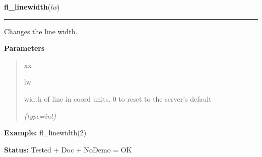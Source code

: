     \label{xformslib:flxbasic:fl_linewidth}

    \vspace{0.5ex}

\hspace{.8\funcindent}\begin{boxedminipage}{\funcwidth}

    \raggedright \textbf{fl\_linewidth}(\textit{lw})

    \vspace{-1.5ex}

    \rule{\textwidth}{0.5\fboxrule}
\setlength{\parskip}{2ex}
    Changes the line width.

\setlength{\parskip}{1ex}
      \textbf{Parameters}
      \vspace{-1ex}

      \begin{quote}
        \begin{Ventry}{xx}

          \item[lw]

          width of line in coord units. 0 to reset to the server's default

            {\it (type=int)}

        \end{Ventry}

      \end{quote}

\textbf{Example:} fl\_linewidth(2)



\textbf{Status:} Tested + Doc + NoDemo = OK



    \end{boxedminipage}

    \label{xformslib:flxbasic:fl_linewidth}

    \vspace{0.5ex}

